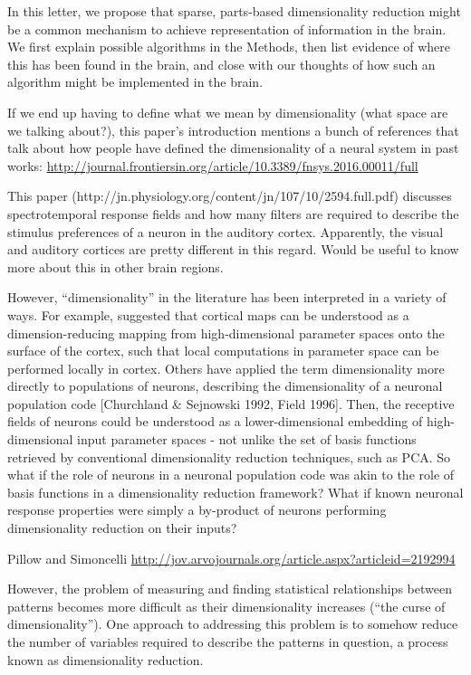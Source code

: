 In this letter, we propose that sparse, parts-based dimensionality reduction might be a common mechanism to achieve representation of information in the brain. We first explain possible algorithms in the Methods, then list evidence of where this has been found in the brain, and close with our thoughts of how such an algorithm might be implemented in the brain.


If we end up having to define what we mean by dimensionality (what space are we talking about?), this paper’s introduction mentions a bunch of references that talk about how people have defined the dimensionality of a neural system in past works: \url{http://journal.frontiersin.org/article/10.3389/fnsys.2016.00011/full}


This paper (http://jn.physiology.org/content/jn/107/10/2594.full.pdf) discusses spectrotemporal response fields and how many filters are required to describe the stimulus preferences of a neuron in the auditory cortex. Apparently, the visual and auditory cortices are pretty different in this regard. Would be useful to  know more about this in other brain regions.



However, ``dimensionality'' in the literature has been interpreted in a variety of ways.
For example, \cite{DurbinMitchison1990} suggested that cortical maps can be understood
as a dimension-reducing mapping from high-dimensional parameter spaces
onto the surface of the cortex,
such that local computations in parameter space can be performed locally in cortex.
Others have applied the term dimensionality more directly to populations of neurons,
describing the dimensionality of a neuronal population code
[Churchland \& Sejnowski 1992, Field 1996].
Then, the receptive fields of neurons could be understood as a lower-dimensional
embedding of high-dimensional input parameter spaces - not unlike the set of basis functions
retrieved by conventional dimensionality reduction techniques, such as \acf{PCA}.
So what if the role of neurons in a neuronal population code was akin to the role of basis
functions in a dimensionality reduction framework?
What if known neuronal response properties were simply a by-product of neurons performing
dimensionality reduction on their inputs?





Pillow and Simoncelli
\url{http://jov.arvojournals.org/article.aspx?articleid=2192994}


However, the problem of measuring and finding statistical relationships between
patterns becomes more difficult as their dimensionality increases
(``the curse of dimensionality'').
One approach to addressing this problem is to somehow reduce the number of variables
required to describe the patterns in question, a process known as dimensionality
reduction.

